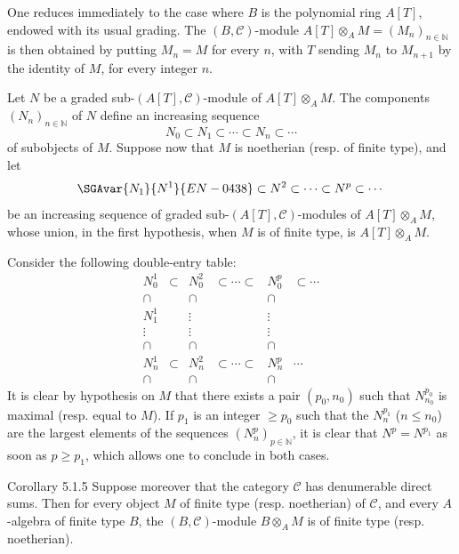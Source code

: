 \begin{prooftext}
One reduces immediately to the case where \(B\) is the polynomial ring \(A[T]\), endowed with its usual grading. The \((B,\mathcal C)\)-module \(A[T]\otimes_A M=(M_n)_{n\in\mathbb N}\) is then obtained by putting \(M_n=M\) for every \(n\), with \(T\) sending \(M_n\) to \(M_{n+1}\) by the identity of \(M\), for every integer \(n\).

Let \(N\) be a graded sub-\((A[T],\mathcal C)\)-module of \(A[T]\otimes_A M\). The components \((N_n)_{n\in\mathbb N}\) of \(N\) define an increasing sequence
\[
N_0\subset N_1\subset\cdots\subset N_n\subset\cdots
\]
of subobjects of \(M\). Suppose now that \(M\) is noetherian (resp. of finite type), and let
\[
\SGAvar{N_1}{N^1}{EN-0438}\subset N^2\subset\cdots\subset N^p\subset\cdots
\]
be an increasing sequence of graded sub-\((A[T],\mathcal C)\)-modules of \(A[T]\otimes_A M\), whose union, in the first hypothesis, when \(M\) is of finite type, is \(A[T]\otimes_A M\).

Consider the following double-entry table:
\[
\begin{array}{cccccc}
N_0^1&\subset&N_0^2&\subset\cdots\subset&N_0^p&\subset\cdots\\
\cap&&\cap&&\cap\\
N_1^1&&\vdots&&\vdots\\
\vdots&&\vdots&&\vdots\\
\cap&&\cap&&\cap\\
N_n^1&\subset&N_n^2&\subset\cdots\subset&N_n^p&\cdots\\
\cap&&\cap&&\cap
\end{array}
\]
It is clear by hypothesis on \(M\) that there exists a pair \((p_0,n_0)\) such that \(N^{p_0}_{n_0}\) is maximal (resp. equal to \(M\)). If \(p_1\) is an integer \(\ge p_0\) such that the \(N_n^{p_1}\) (\(n\le n_0\)) are the largest elements of the sequences \((N_n^p)_{p\in\mathbb N}\), it is clear that \(N^p=N^{p_1}\) as soon as \(p\ge p_1\), which allows one to conclude in both cases.
\end{prooftext}

\begin{statement}{Corollary 5.1.5}
Suppose moreover that the category \(\mathcal C\) has denumerable direct sums. Then for every object \(M\) of finite type (resp. noetherian) of \(\mathcal C\), and every \(A\)-algebra of finite type \(B\), the \((B,\mathcal C)\)-module \(B\otimes_A M\) is of finite type (resp. noetherian).
\end{statement}

